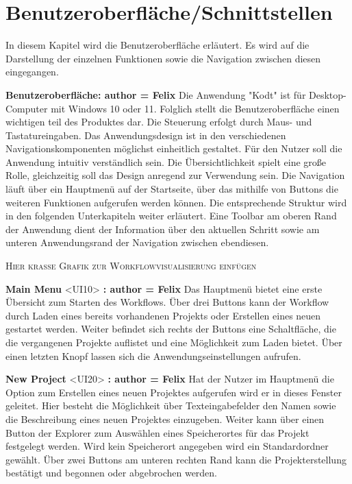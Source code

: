 \documentclass[parskip=full]{scrartcl} %
\begin{document}
\newpage



\section{Benutzeroberfläche/Schnittstellen}
In diesem Kapitel wird die Benutzeroberfläche erläutert. Es wird auf die Darstellung der einzelnen Funktionen sowie die Navigation zwischen diesen eingegangen.

\textbf{Benutzeroberfläche: author = Felix}
Die Anwendung "Kodt" ist für Desktop-Computer mit Windows 10 oder 11. Folglich stellt die Benutzeroberfläche einen wichtigen teil des Produktes dar.
Die Steuerung erfolgt durch Maus- und Tastatureingaben. Das Anwendungsdesign ist in den verschiedenen Navigationskomponenten möglichst einheitlich gestaltet. Für den Nutzer soll die Anwendung intuitiv verständlich sein. Die Übersichtlichkeit spielt eine große Rolle, gleichzeitig soll das Design anregend zur Verwendung sein.
Die Navigation läuft über ein Hauptmenü auf der Startseite, über das mithilfe von Buttons die weiteren Funktionen aufgerufen werden können. Die entsprechende Struktur wird in den folgenden Unterkapiteln weiter erläutert. Eine Toolbar am oberen Rand der Anwendung dient der Information über den aktuellen Schritt sowie am unteren Anwendungsrand der Navigation zwischen ebendiesen.

\textsc{Hier krasse Grafik zur Workflowvisualisierung einfügen}

\textbf{Main Menu }<UI10>\textbf{ : author = Felix}
Das Hauptmenü bietet eine erste Übersicht zum Starten des Workflows. Über drei Buttons kann der Workflow durch Laden eines bereits vorhandenen Projekts oder Erstellen eines neuen gestartet werden. Weiter befindet sich rechts der Buttons eine Schaltfläche, die die vergangenen Projekte auflistet und eine Möglichkeit zum Laden bietet. Über einen letzten Knopf lassen sich die Anwendungseinstellungen aufrufen.

\textbf{New Project }<UI20>\textbf{ : author = Felix}
Hat der Nutzer im Hauptmenü die Option zum Erstellen eines neuen Projektes aufgerufen wird er in dieses Fenster geleitet.
Hier besteht die Möglichkeit über Texteingabefelder den Namen sowie die Beschreibung eines neuen Projektes einzugeben. Weiter kann über einen Button der Explorer zum Auswählen eines Speicherortes für das Projekt festgelegt werden. Wird kein Speicherort angegeben wird ein Standardordner gewählt.
Über zwei Buttons am unteren rechten Rand kann die Projekterstellung bestätigt und begonnen oder abgebrochen werden.
\end{document}
